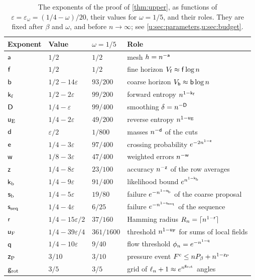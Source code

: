 \begin{table}[!t]
\centering
\small
\caption{The exponents of the proof of \cref{thm:upper}, as functions of
$\varepsilon=\varepsilon_\omega=(1/4-\omega)/20$, their values for
$\omega=1/5$, and their roles. They are fixed after $\beta$ and $\omega$, and
before $n\to\infty$; see \cref{u:sec:parameters,u:sec:budget}.}
\label{tab:ov-upper-exponents}
\begin{tabular}{@{}lll>{\raggedright\arraybackslash}p{}@{}}
\toprule
Exponent & Value & $\omega=1/5$ & Role\\
\midrule
$\mathsf{a}$ & $1/2$ & $1/2$ & mesh $h=n^{-\mathsf{a}}$\\
$\mathsf{f}$ & $1/2$ & $1/2$ & fine horizon $V_{\mathsf{f}}\approx\mathsf{f}\log n$\\
$\mathsf{b}$ & $1/2-14\varepsilon$ & $93/200$ & coarse horizon $V_{\mathsf{b}}\approx\mathsf{b}\log n$\\
$\mathsf{k}_{\rm f}$ & $1/2-2\varepsilon$ & $99/200$ & forward entropy $n^{1-\mathsf{k}_{\rm f}}$\\
$\mathsf{D}$ & $1/4-\varepsilon$ & $99/400$ & smoothing $\delta=n^{-\mathsf{D}}$\\
$\mathsf{u}_{\rm E}$ & $1/4-2\varepsilon$ & $49/200$ & reverse entropy $n^{1-\mathsf{u}_{\rm E}}$\\
$\mathsf{d}$ & $\varepsilon/2$ & $1/800$ & masses $n^{-\mathsf{d}}$ of the cuts\\
$\mathsf{e}$ & $1/4-3\varepsilon$ & $97/400$ & crossing probability $e^{-2n^{1-\mathsf{e}}}$\\
$\mathsf{w}$ & $1/8-3\varepsilon$ & $47/400$ & weighted errors $n^{-\mathsf{w}}$\\
$\mathsf{z}$ & $1/4-8\varepsilon$ & $23/100$ & accuracy $n^{-\mathsf{z}}$ of the row averages\\
$\mathsf{k}_{\rm b}$ & $1/4-9\varepsilon$ & $91/400$ & likelihood bound $e^{n^{1-\mathsf{k}_{\rm b}}}$\\
$\mathsf{s}_{\rm b}$ & $1/4-5\varepsilon$ & $19/80$ & failure $e^{-n^{1-\mathsf{s}_{\rm b}}}$ of the coarse proposal\\
$\mathsf{s}_{\rm seq}$ & $1/4-4\varepsilon$ & $6/25$ & failure $e^{-n^{1-\mathsf{s}_{\rm seq}}}$ of the sequence\\
$\mathsf{r}$ & $1/4-15\varepsilon/2$ & $37/160$ & Hamming radius $R_n=\lceil n^{1-\mathsf{r}}\rceil$\\
$\mathsf{u}_{\rm F}$ & $1/4-39\varepsilon/4$ & $361/1600$ & threshold $n^{1-\mathsf{u}_{\rm F}}$ for sums of local fields\\
$\mathsf{q}$ & $1/4-10\varepsilon$ & $9/40$ & flow threshold $\phi_n=e^{-n^{1-\mathsf{q}}}$\\
$\mathsf{z}_{\rm P}$ & $3/10$ & $3/10$ & pressure event $F^c\le nP_\beta+n^{1-\mathsf{z}_{\rm P}}$\\
$\mathsf{g}_{\rm rot}$ & $3/5$ & $3/5$ & grid of $\ell_n+1\approx e^{n^{\mathsf{g}_{\rm rot}}}$ angles\\
\bottomrule
\end{tabular}
\end{table}

